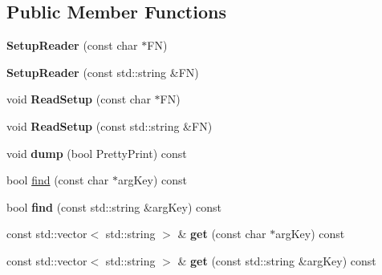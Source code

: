 \subsection*{Public Member Functions}
\begin{DoxyCompactItemize}
\item 
{\bfseries Setup\+Reader} (const char $\ast$FN)\hypertarget{classSetupReader_abc7e894e1e1467fe04563d135459f3e5}{}\label{classSetupReader_abc7e894e1e1467fe04563d135459f3e5}

\item 
{\bfseries Setup\+Reader} (const std\+::string \&FN)\hypertarget{classSetupReader_a172ff7531a51c6471832531c2657b8b4}{}\label{classSetupReader_a172ff7531a51c6471832531c2657b8b4}

\item 
void {\bfseries Read\+Setup} (const char $\ast$FN)\hypertarget{classSetupReader_ac0d114a88ce4508719c52c50f773a6c9}{}\label{classSetupReader_ac0d114a88ce4508719c52c50f773a6c9}

\item 
void {\bfseries Read\+Setup} (const std\+::string \&FN)\hypertarget{classSetupReader_af746ca4e83e2d5e1f0174d2404351b8b}{}\label{classSetupReader_af746ca4e83e2d5e1f0174d2404351b8b}

\item 
void {\bfseries dump} (bool Pretty\+Print) const \hypertarget{classSetupReader_a1bd44ec38aac137acadce5b52427586b}{}\label{classSetupReader_a1bd44ec38aac137acadce5b52427586b}

\item 
bool \hyperlink{classSetupReader_a98207fe4240df790a2155368243006d5}{find} (const char $\ast$arg\+Key) const 
\item 
bool {\bfseries find} (const std\+::string \&arg\+Key) const \hypertarget{classSetupReader_a5cf206e3da57ffd8b84e30b38927945a}{}\label{classSetupReader_a5cf206e3da57ffd8b84e30b38927945a}

\item 
const std\+::vector$<$ std\+::string $>$ \& {\bfseries get} (const char $\ast$arg\+Key) const \hypertarget{classSetupReader_ab689005762b1d2c2e3ddd4d895f88fb6}{}\label{classSetupReader_ab689005762b1d2c2e3ddd4d895f88fb6}

\item 
const std\+::vector$<$ std\+::string $>$ \& {\bfseries get} (const std\+::string \&arg\+Key) const \hypertarget{classSetupReader_a68ff2717b1d1defb9ad8da4742513698}{}\label{classSetupReader_a68ff2717b1d1defb9ad8da4742513698}

\end{DoxyCompactItemize}


